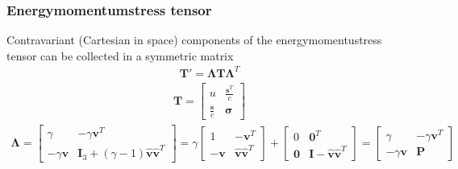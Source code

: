 \documentclass[letterpaper,10pt,english]{jupyterBook}
\begin{document}
\subsubsection*{Energy\sphinxhyphen{}momentum\sphinxhyphen{}stress tensor}

\sphinxAtStartPar
{} 

\sphinxAtStartPar
Contravariant (Cartesian in space) components of the energy\sphinxhyphen{}momentu\sphinxhyphen{}stress tensor can be collected in a symmetric matrix
\begin{equation*}
\begin{split}\mathbf{T}' = \symbf{\Lambda} \mathbf{T} \symbf{\Lambda}^T\end{split}
\end{equation*}\begin{equation*}
\begin{split}\mathbf{T} = \begin{bmatrix} u & \frac{\mathbf{s}^T}{c} \\ \frac{\mathbf{s}}{c} & \symbf{\sigma} \end{bmatrix}\end{split}
\end{equation*}\begin{equation*}
\begin{split}\symbf{\Lambda} = \begin{bmatrix} \gamma & - \gamma \mathbf{v}^T \\ -\gamma \mathbf{v} & \mathbf{I}_3 + (\gamma-1) \mathbf{\hat{v}}\mathbf{\hat{v}}^T  \end{bmatrix} = \gamma \begin{bmatrix} 1 & - \mathbf{v}^T \\ -\mathbf{v} & \hat{\mathbf{v}} \hat{\mathbf{v}}^T \end{bmatrix} + \begin{bmatrix} 0 & \mathbf{0}^T \\ \mathbf{0} & \mathbf{I} - \hat{\mathbf{v}} \hat{\mathbf{v}}^T \end{bmatrix}
= \begin{bmatrix}  \gamma & - \gamma \mathbf{v}^T \\ -\gamma \mathbf{v} & \mathbf{P} \end{bmatrix} \end{split}
\end{equation*}\begin{equation*}
\begin{split}\begin{aligned}

\end{aligned}
\end{split}
\end{equation*}
\end{document}
